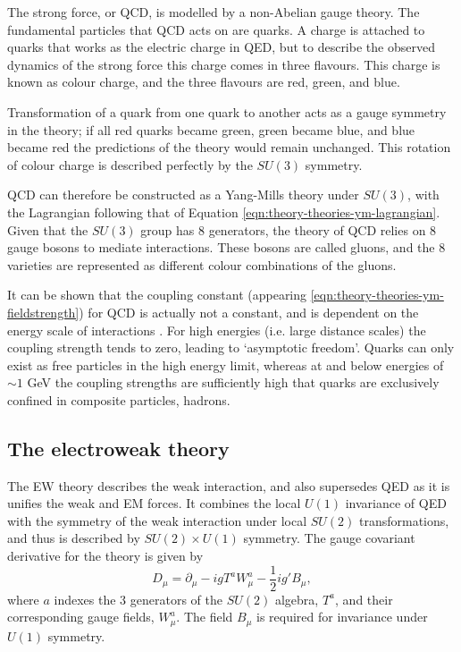 The strong force, or \ac{QCD}, is modelled by a non-Abelian gauge theory. The
fundamental particles that \ac{QCD} acts on are quarks.
A charge is attached to quarks that works as the electric charge in \ac{QED},
but to describe the observed dynamics of the strong force this charge comes in
three flavours. This charge is known as colour charge, and the three flavours
are red, green, and blue.

Transformation of a quark from one quark to another acts as a gauge symmetry in
the theory; if all red quarks became green, green became blue, and blue became
red the predictions of the theory would remain unchanged. This rotation of
colour charge is described perfectly by the $SU(3)$ symmetry.

\ac{QCD} can therefore be constructed as a Yang-Mills theory under $SU(3)$,
with the Lagrangian following that of Equation
\ref{eqn:theory-theories-ym-lagrangian}. Given that the $SU(3)$ group has 8
generators, the theory of \ac{QCD} relies on 8 gauge bosons to mediate
interactions. These bosons are called gluons, and the 8 varieties are
represented as different colour combinations of the gluons.

It can be shown that the coupling constant (appearing
\ref{eqn:theory-theories-ym-fieldstrength}) for \ac{QCD} is actually not a
constant, and is dependent on the energy scale of interactions \cite{PDG2022}.
For high energies (i.e. large distance scales) the coupling strength tends to
zero, leading to `asymptotic freedom'. Quarks can only exist as free particles
in the high energy limit, whereas at and below energies of $\sim1$ GeV the
coupling strengths are sufficiently high that quarks are exclusively confined in
composite particles, hadrons.


\subsection{The electroweak theory}
\label{sec:theory-theories-ew}

The \ac{EW} theory describes the weak interaction, and also supersedes \ac{QED}
as it is unifies the weak and \ac{EM} forces.  It combines the local $U(1)$
invariance of \ac{QED} with the symmetry of the weak interaction under local
$SU(2)$ transformations, and thus is described by $SU(2)\times U(1)$ symmetry.
The gauge covariant derivative for the theory is given by
%
\begin{equation*}
  D_\mu = \partial_\mu - igT^a W^a_\mu - \frac12 ig'B_\mu,
\end{equation*}
where $a$ indexes the 3 generators of the $SU(2)$ algebra, $T^a$, and their
corresponding gauge fields, $W^a_\mu$. The field $B_\mu$ is required for
invariance under $U(1)$ symmetry.

